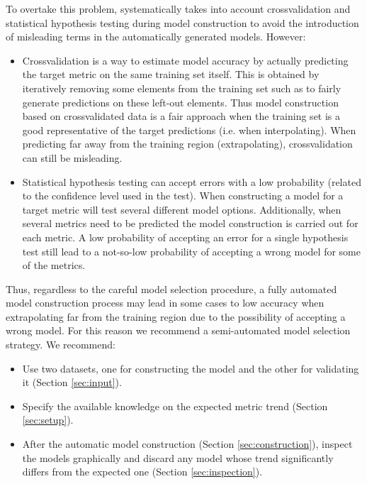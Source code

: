 \documentclass[a4paper, 10pt]{article}
\begin{document}
To overtake this problem, \ex systematically takes into account crossvalidation and statistical hypothesis testing
during model construction to avoid the introduction of misleading terms in the automatically generated models.
However:
\begin{itemize}
 \item Crossvalidation is a way to estimate model accuracy by actually predicting the target metric on
the same training set itself. This is obtained by iteratively removing some elements from the training set such as to fairly
generate predictions on these left-out elements.
Thus model construction based on crossvalidated data is a fair approach when the training set is a good representative of
the target predictions (i.e. when interpolating). When predicting far away from the training region (extrapolating),
crossvalidation can still be misleading.
 \item Statistical hypothesis testing can accept errors with a low probability (related to the confidence level used in the test).
 When constructing a model for a target metric \ex will test several different model options. Additionally, when several metrics need
 to be predicted the model construction is carried out
 for each metric. A low probability of accepting an error for a single
 hypothesis test still lead to a not-so-low probability of accepting a wrong model for some of the metrics.
\end{itemize}

Thus, regardless to the careful model selection procedure, a fully automated model construction process may lead in some cases
to low accuracy when extrapolating far from the training region due to the possibility of accepting a wrong model.
For this reason we recommend a semi-automated model selection strategy. We recommend:
\begin{itemize}
 \item Use two datasets, one for constructing the model and the other for validating it (Section \ref{sec:input}).
 \item Specify the available knowledge on the expected metric trend (Section \ref{sec:setup}).
 \item After the automatic model construction (Section \ref{sec:construction}), inspect the models graphically and discard any
 model whose trend significantly differs from the expected one (Section \ref{sec:inspection}).
\end{itemize}
\end{document}
